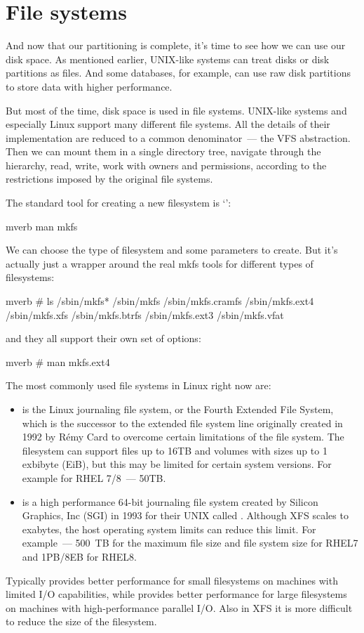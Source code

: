 \section*{File systems} %

And now that our partitioning is complete, it's time to see how we can use
our disk space. As mentioned earlier, UNIX-like systems can treat disks or
disk partitions as files. And some databases, for example, can use raw disk
partitions to store data with higher performance.

But most of the time, disk space is used in file systems. UNIX-like systems
and especially Linux support many different file systems. All the details of
their implementation are reduced to a common denominator~--- the VFS abstraction.
Then we can mount them in a single directory tree, navigate through
the hierarchy, read, write, work with owners and permissions, according to
the restrictions imposed by the original file systems.

The standard tool for creating a new filesystem is `':
\begin{code}{mverb}
man mkfs
\end{code}
We can choose the type of filesystem and some parameters to create.
But it's actually just a wrapper around the real mkfs tools for different
types of filesystems:
\begin{code}{mverb}
# ls /sbin/mkfs*
/sbin/mkfs        /sbin/mkfs.cramfs  /sbin/mkfs.ext4  /sbin/mkfs.xfs
/sbin/mkfs.btrfs  /sbin/mkfs.ext3    /sbin/mkfs.vfat
\end{code}
and they all support their own set of options:
\begin{code}{mverb}
# man mkfs.ext4
\end{code}
The most commonly used file systems in Linux right now are:
\begin{itemize}
\item {} is the Linux journaling file system, or the Fourth
      Extended File System, which is the successor to the extended file system
      line originally created in 1992 by R\'{e}my Card to overcome certain
      limitations of the  file system. The  filesystem
      can support files up to 16TB and volumes with sizes up to 1 exbibyte (EiB),
      but this may be limited for certain system versions.
      For example for RHEL 7/8~--- 50TB.
\item {} is a high performance 64-bit journaling file system created
      by Silicon Graphics, Inc (SGI) in 1993 for their UNIX called .
      Although XFS scales to exabytes, the host operating system limits can
      reduce this limit. For example~--- 500~TB for the maximum file size and
      file system size for RHEL7 and 1PB/8EB for RHEL8.
\end{itemize}
Typically  provides better performance for small filesystems on
machines with limited I/O capabilities, while  provides better
performance for large filesystems on machines with high-performance
parallel I/O. Also in XFS it is more difficult to reduce the size of the
filesystem.

